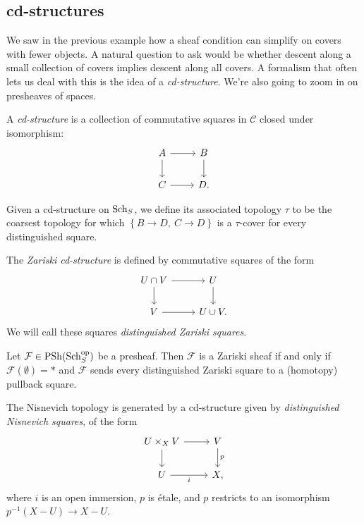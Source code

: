 \documentclass[11pt,openany]{book}
\renewcommand{\Pre}{\mathrm{PSh}}
\begin{document}
\subsection{cd-structures} We saw in the previous example how a sheaf condition can simplify on covers with fewer objects. A natural question to ask would be whether descent along a small collection of covers implies descent along all covers. A formalism that often lets us deal with this is the idea of a \textit{cd-structure}. We're also going to zoom in on presheaves of spaces.

\begin{definition} A \textit{cd-structure} is a collection of commutative squares in $\mathscr{C}$ closed under isomorphism:
\[ \begin{tikzcd}
    A\rar\dar & B\dar\\
    C\rar & D.
\end{tikzcd} \]
\end{definition}

\begin{terminology} Given a cd-structure on $\mathrm{Sch}_S$, we define its associated topology $\tau$ to be the coarsest topology for which $\left\{ B\to D,\ C\to D \right\}$ is a $\tau$-cover for every distinguished square.
\end{terminology}



\begin{example} The \textit{Zariski cd-structure} is defined by commutative squares of the form
\[\begin{tikzcd}
    U\cap V\rar\dar & U\dar\\
    V\rar & U\cup V.
\end{tikzcd} \]
We will call these squares \textit{distinguished Zariski squares}.
\end{example}


\begin{theorem} Let $\mathcal{F} \in \Pre(\Sch_S^\op)$ be a presheaf. Then $\mathcal{F}$ is a Zariski sheaf if and only if $\mathcal{F}(\emptyset) = \ast$ and $\mathcal{F}$ sends every distinguished Zariski square to a (homotopy) pullback square.
\end{theorem}






\begin{example} The Nisnevich topology is generated by a cd-structure given by \textit{distinguished Nisnevich squares}, of the form
\[ \begin{tikzcd}
    U \times_X V\rar\dar & V\dar["p" right]\\
    U\rar["i" below] & X,
\end{tikzcd} \]
where $i$ is an open immersion, $p$ is \'etale, and $p$ restricts to an isomorphism $p^{-1}(X-U)\to X-U$.
\end{example}
\end{document}
